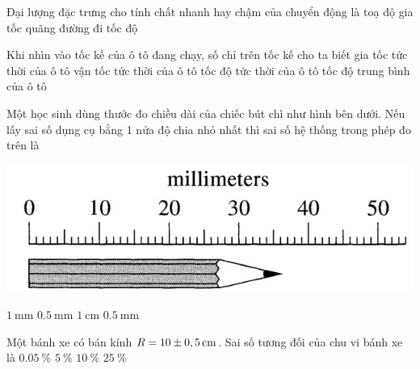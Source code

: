 \begin{ex}
	Đại lượng đặc trưng cho tính chất nhanh hay chậm của chuyển động là 
	\choice
	{toạ độ}
	{gia tốc}
	{quãng đường đi}
	{\True tốc độ}
	\loigiai{}
\end{ex}
\begin{ex}
	Khi nhìn vào tốc kế của ô tô đang chạy, số chỉ trên tốc kế cho ta biết
	\choice
	{gia tốc tức thời của ô tô}
	{vận tốc tức thời của ô tô}
	{\True tốc độ tức thời của ô tô}
	{tốc độ trung bình của ô tô}
	\loigiai{}
\end{ex}
\begin{ex}
	Một học sinh dùng thước đo chiều dài của chiếc bút chì như hình bên dưới. Nếu lấy sai số dụng cụ bằng 1 nửa độ chia nhỏ nhất thì sai số hệ thống trong phép đo trên là	
	\begin{center}
		\includegraphics[width=0.4\linewidth]{../figs/D10-2-2}
	\end{center}
	\choice
	{$\SI{1}{\milli\meter}$}
	{\True $\SI{0.5}{\milli\meter}$}
	{$\SI{1}{\centi\meter}$}
	{$\SI{0.5}{\milli\meter}$}
	\loigiai{}
\end{ex}

\begin{ex}
	Một bánh xe có bán kính $R=\xsi{10\pm0,5}{\centi\meter}$. Sai số tương đối của chu vi bánh xe là
	\choice
	{$\SI{0.05}{\percent}$}
	{\True $\SI{5}{\percent}$}
	{$\SI{10}{\percent}$}
	{$\SI{25}{\percent}$}
\end{ex}

